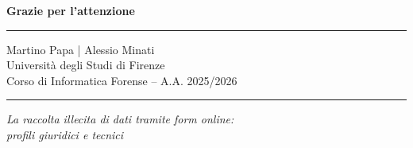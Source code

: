 \documentclass[aspectratio=169]{beamer}
\begin{document}
\begin{frame}
  \vfill
  \begin{center}
    {\Huge\bfseries\color{legaleblue} Grazie per l'attenzione}

    \vspace{0.8cm}
    \rule{0.6\linewidth}{0.4pt}

    \vspace{0.4cm}
    {\large Martino Papa \quad | \quad Alessio Minati}\\[0.3em]
    {\small Università degli Studi di Firenze\\
    Corso di Informatica Forense -- A.A. 2025/2026}

    \vspace{0.8cm}
    \rule{0.6\linewidth}{0.4pt}

    \vspace{0.4cm}
    {\small\color{legalegray} \textit{La raccolta illecita di dati tramite \emph{form} online:\\
    profili giuridici e tecnici}}
  \end{center}
  \vfill
\end{frame}
\end{document}
